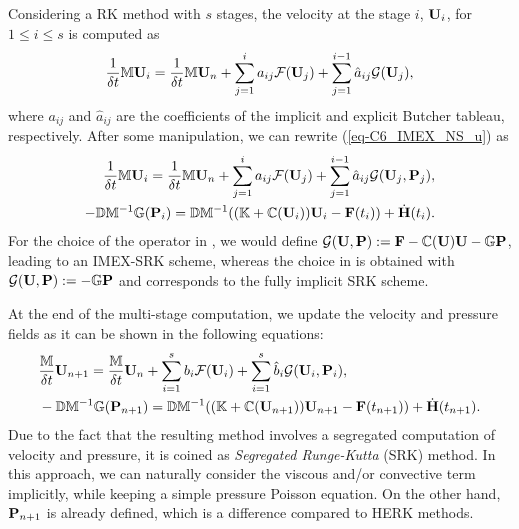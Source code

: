 Considering a RK method with $s$ stages, the velocity at the stage $i$, $\U_i$, for $1\leq i\leq s$ is computed as
\begin{equation}
\label{eq-C6_IMEX_NS_u}
\frac{1}{\delta t}\M\U_i=\frac{1}{\delta t}\M\U_n+\sum_{j=1}^ia_{ij}\mathcal{F}(\U_j)+\sum_{j=1}^{i-1}\hat{a}_{ij}\mathcal{G}(\U_j),
\end{equation}
where $a_{ij}$ and $\hat{a}_{ij}$ are the coefficients of the implicit and explicit Butcher tableau, respectively.  
After some manipulation, we can rewrite (\ref{eq-C6_IMEX_NS_u}) as
\begin{subequations}\label{eq-C6_IMEX_NS_up}
\begin{align}
\label{eq-C6_IMEX_NS_up_u}
\frac{1}{\delta t}\M\U_i=\frac{1}{\delta t}\M\U_n+\sum_{j=1}^ia_{ij}\mathcal{F}(\U_j)+\sum_{j=1}^{i-1}\hat{a}_{ij} \mathcal{G}(\U_j,\P_j), \\
\label{eq-C6_IMEX_NS_up_p}
- \D\M^{-1}\G(\P_i)=\D\M^{-1}((\K+\C(\U_i))\U_i - \F(t_i)) +\dot{\H}(t_i).
\end{align}
\end{subequations}
For the choice of the operator in , we would define $\mathcal{G}(\U,\P):=\F-\C(\U)\U-\G\P$, leading to an IMEX-SRK scheme, whereas the choice in  is obtained with  $\mathcal{G}(\U,\P):=-\G\P$ and corresponds to the fully implicit SRK scheme.

At the end of the multi-stage computation, we update the velocity and pressure fields as it can be shown in the following equations:
\begin{subequations}
\label{eq-C6_IMEX_NS_up_n+1}
\begin{align}
\label{eq-C6_IMEX_NS_u_n+1}
&\frac{\M}{\delta t}\U_{n+1}=\frac{\M}{\delta t}\U_n+\sum_{i=1}^sb_i\mathcal{F}(\U_i)+\sum_{i=1}^s\hat{b}_i\mathcal{G}(\U_i,\P_i),\\
\label{eq-C6_IMEX_NS_p_n+1}
& - \D\M^{-1}\G(\P_{n+1})=\D\M^{-1}((\K+\C(\U_{n+1}))\U_{n+1} - \F(t_{n+1})) + \dot{\H}(t_{n+1}).%
\end{align}
\end{subequations}
Due to the fact that the resulting method involves a segregated computation of velocity and  pressure, it is coined as \emph{Segregated Runge-Kutta} (SRK) method. In this approach, we can naturally consider the viscous and/or convective term implicitly, while keeping a simple pressure Poisson equation. On the other hand, $\P_{n+1}$ is already defined, which is a difference compared to HERK methods. 

